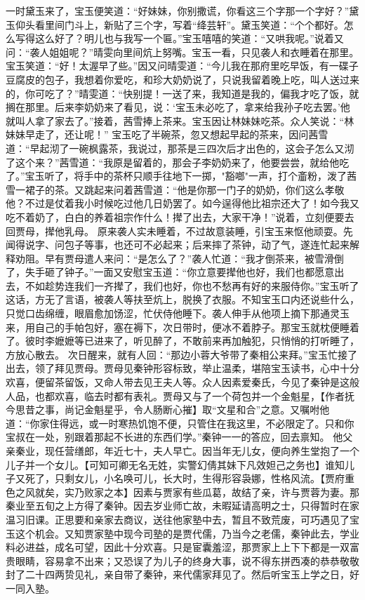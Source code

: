 \documentclass[12pt,oneside]{book}
\begin{document}
一时黛玉来了，宝玉便笑道：“好妹妹，你别撒谎，你看这三个字那一个字好？”黛玉仰头看里间门斗上，新贴了三个字，写着“绛芸轩”。黛玉笑道：“个个都好。怎么写得这么好了？明儿也与我写一个匾。”宝玉嘻嘻的笑道：“又哄我呢。”说着又问：“袭人姐姐呢？”晴雯向里间炕上努嘴。宝玉一看，只见袭人和衣睡着在那里。宝玉笑道：“好！太渥早了些。”因又问晴雯道：“今儿我在那府里吃早饭，有一碟子豆腐皮的包子，我想着你爱吃，和珍大奶奶说了，只说我留着晚上吃，叫人送过来的，你可吃了？”晴雯道：“快别提！一送了来，我知道是我的，偏我才吃了饭，就搁在那里。后来李奶奶来了看见，说：‘宝玉未必吃了，拿来给我孙子吃去罢。’他就叫人拿了家去了。”接着，茜雪捧上茶来。宝玉因让林妹妹吃茶。众人笑说：“林妹妹早走了，还让呢！”
宝玉吃了半碗茶，忽又想起早起的茶来，因问茜雪道：“早起沏了一碗枫露茶，我说过，那茶是三四次后才出色的，这会子怎么又沏了这个来？”茜雪道：“我原是留着的，那会子李奶奶来了，他要尝尝，就给他吃了。”宝玉听了，将手中的茶杯只顺手往地下一掷，"豁啷"一声，打个齑粉，泼了茜雪一裙子的茶。又跳起来问着茜雪道：“他是你那一门子的奶奶，你们这么孝敬他？不过是仗着我小时候吃过他几日奶罢了。如今逞得他比祖宗还大了！如今我又吃不着奶了，白白的养着祖宗作什么！撵了出去，大家干净！”说着，立刻便要去回贾母，撵他乳母。
原来袭人实未睡着，不过故意装睡，引宝玉来怄他顽耍。先闻得说字、问包子等事，也还可不必起来；后来摔了茶钟，动了气，遂连忙起来解释劝阻。早有贾母遣人来问：“是怎么了？”袭人忙道：“我才倒茶来，被雪滑倒了，失手砸了钟子。”一面又安慰宝玉道：“你立意要撵他也好，我们也都愿意出去，不如趁势连我们一齐撵了，我们也好，你也不愁再有好的来服侍你。”宝玉听了这话，方无了言语，被袭人等扶至炕上，脱换了衣服。不知宝玉口内还说些什么，只觉口齿绵缠，眼眉愈加饧涩，忙伏侍他睡下。袭人伸手从他项上摘下那通灵玉来，用自己的手帕包好，塞在褥下，次日带时，便冰不着脖子。那宝玉就枕便睡着了。彼时李嬷嬷等已进来了，听见醉了，不敢前来再加触犯，只悄悄的打听睡了，方放心散去。
次日醒来，就有人回：“那边小蓉大爷带了秦相公来拜。”宝玉忙接了出去，领了拜见贾母。贾母见秦钟形容标致，举止温柔，堪陪宝玉读书，心中十分欢喜，便留茶留饭，又命人带去见王夫人等。众人因素爱秦氏，今见了秦钟是这般人品，也都欢喜，临去时都有表礼。贾母又与了一个荷包并一个金魁星，【作者抚今思昔之事，尚记金魁星乎，令人肠断心摧】取“文星和合”之意。又嘱咐他道：“你家住得远，或一时寒热饥饱不便，只管住在我这里，不必限定了。只和你宝叔在一处，别跟着那起不长进的东西们学。”秦钟一一的答应，回去禀知。
他父亲秦业，现任营缮郎，年近七十，夫人早亡。因当年无儿女，便向养生堂抱了一个儿子并一个女儿。【可知可卿无名无姓，实警幻倩其妹下凡效妲己之务也】谁知儿子又死了，只剩女儿，小名唤可儿，长大时，生得形容袅娜，性格风流。【贾府重色之风就矣，实乃败家之本】因素与贾家有些瓜葛，故结了亲，许与贾蓉为妻。那秦业至五旬之上方得了秦钟。因去岁业师亡故，未暇延请高明之士，只得暂时在家温习旧课。正思要和亲家去商议，送往他家塾中去，暂且不致荒废，可巧遇见了宝玉这个机会。又知贾家塾中现今司塾的是贾代儒，乃当今之老儒，秦钟此去，学业料必进益，成名可望，因此十分欢喜。只是宦囊羞涩，那贾家上上下下都是一双富贵眼睛，容易拿不出来；又恐误了为儿子的终身大事，说不得东拼西凑的恭恭敬敬封了二十四两贽见礼，亲自带了秦钟，来代儒家拜见了。然后听宝玉上学之日，好一同入塾。
\end{document}
